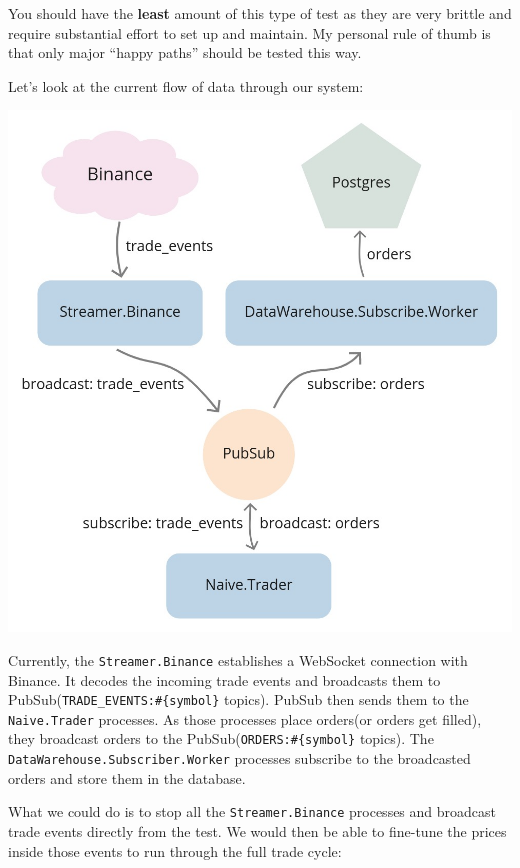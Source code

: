 \documentclass[
  oneside]{book}
\begin{document}
You should have the \textbf{least} amount of this type of test as they are very brittle and require substantial effort to set up and maintain. My personal rule of thumb is that only major ``happy paths'' should be tested this way.

\newpage

Let's look at the current flow of data through our system:

\begin{center}\includegraphics[width=1\linewidth]{images/chapter_16_01_current_flow} \end{center}

Currently, the \texttt{Streamer.Binance} establishes a WebSocket connection with Binance. It decodes the incoming trade events and broadcasts them to PubSub(\texttt{TRADE\_EVENTS:\#\{symbol\}} topics). PubSub then sends them to the \texttt{Naive.Trader} processes. As those processes place orders(or orders get filled), they broadcast orders to the PubSub(\texttt{ORDERS:\#\{symbol\}} topics). The \texttt{DataWarehouse.Subscriber.Worker} processes subscribe to the broadcasted orders and store them in the database.

\newpage

What we could do is to stop all the \texttt{Streamer.Binance} processes and broadcast trade events directly from the test. We would then be able to fine-tune the prices inside those events to run through the full trade cycle:
\end{document}
